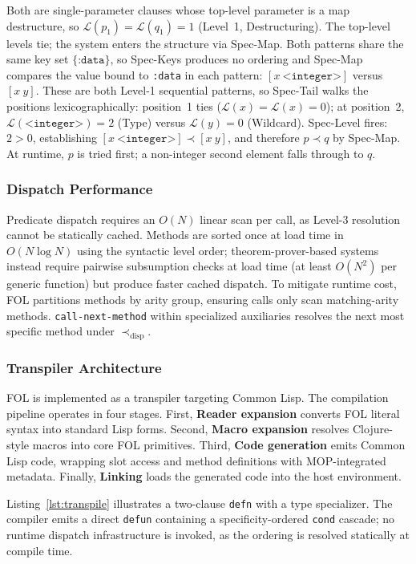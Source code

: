 \documentclass[sigconf,nonacm]{acmart}
\begin{document}
\noindent Both are single-parameter clauses whose top-level parameter is a map destructure, so $\mathcal{L}(p_1) = \mathcal{L}(q_1) = 1$ (Level~1, Destructuring). The top-level levels tie; the system enters the structure via Spec-Map. Both patterns share the same key set $\{\texttt{:data}\}$, so Spec-Keys produces no ordering and Spec-Map compares the value bound to \texttt{:data} in each pattern:
$[x~\texttt{<integer>}]$ versus $[x~y]$.
These are both Level-1 sequential patterns, so Spec-Tail walks the positions lexicographically:
position~1 ties ($\mathcal{L}(x) = \mathcal{L}(x) = 0$);
at position~2, $\mathcal{L}(\texttt{<integer>}) = 2$ (Type) versus $\mathcal{L}(y) = 0$ (Wildcard).
Spec-Level fires: $2 > 0$, establishing $[x~\texttt{<integer>}] \prec [x~y]$, and therefore $p \prec q$ by Spec-Map.
At runtime, $p$ is tried first; a non-integer second element falls through to $q$.

\subsubsection{Dispatch Performance}
Predicate dispatch requires an $O(N)$ linear scan per call, as Level-3 resolution cannot be statically cached. Methods are sorted once at load time in $O(N \log N)$ using the syntactic level order; theorem-prover-based systems instead require pairwise subsumption checks at load time (at least $O(N^2)$ per generic function) but produce faster cached dispatch. To mitigate runtime cost, FOL partitions methods by arity group, ensuring calls only scan matching-arity methods. \texttt{call-next-method} within specialized auxiliaries resolves the next most specific method under $\prec_{\text{disp}}$.

\subsubsection{Transpiler Architecture}
FOL is implemented as a transpiler targeting Common Lisp. The compilation pipeline operates in four stages. First, \textbf{Reader expansion} converts FOL literal syntax into standard Lisp forms. Second, \textbf{Macro expansion} resolves Clojure-style macros into core FOL primitives. Third, \textbf{Code generation} emits Common Lisp code, wrapping slot access and method definitions with MOP-integrated metadata. Finally, \textbf{Linking} loads the generated code into the host environment.

Listing~\ref{lst:transpile} illustrates a two-clause \texttt{defn} with a type specializer. The compiler emits a direct \texttt{defun} containing a specificity-ordered \texttt{cond} cascade; no runtime dispatch infrastructure is invoked, as the ordering is resolved statically at compile time.
\end{document}
